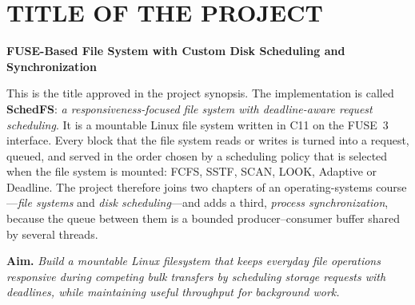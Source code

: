 \documentclass[12pt,a4paper]{article}
\newcommand{\projecttitle}{FUSE-Based File System with Custom Disk Scheduling and Synchronization}
\begin{document}
\setcounter{page}{2}  %
\tableofcontents
\clearpage
\listoffigures
\clearpage
\listoftables
\vspace{1.2em}
\lstlistoflistings
\clearpage
{}
\setcounter{page}{1}

\section{TITLE OF THE PROJECT}
\label{sec:title}
\begin{center}
\fontsize{13.9}{18}\selectfont\bfseries \projecttitle
\end{center}

\noindent This is the title approved in the project synopsis. The implementation is called \textbf{SchedFS}: \emph{a responsiveness-focused file system with deadline-aware request scheduling}. It is a mountable Linux file system written in C11 on the FUSE~3 interface. Every block that the file system reads or writes is turned into a request, queued, and served in the order chosen by a scheduling policy that is selected when the file system is mounted: FCFS, SSTF, SCAN, LOOK, Adaptive or Deadline. The project therefore joins two chapters of an operating-systems course---\emph{file systems} and \emph{disk scheduling}---and adds a third, \emph{process synchronization}, because the queue between them is a bounded producer--consumer buffer shared by several threads.

\noindent\textbf{Aim.} \emph{Build a mountable Linux filesystem that keeps everyday file operations responsive during competing bulk transfers by scheduling storage requests with deadlines, while maintaining useful throughput for background work.}
\end{document}
